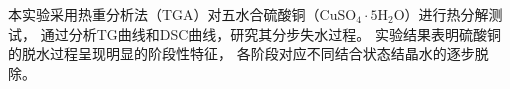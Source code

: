\begin{MUCAbstract}
    本实验采用热重分析法（TGA）对五水合硫酸铜（$\mathrm{CuSO_4 \cdot 5H_2O}$）进行热分解测试，
    通过分析TG曲线和DSC曲线，研究其分步失水过程。
    实验结果表明硫酸铜的脱水过程呈现明显的阶段性特征，
    各阶段对应不同结合状态结晶水的逐步脱除。
\end{MUCAbstract}